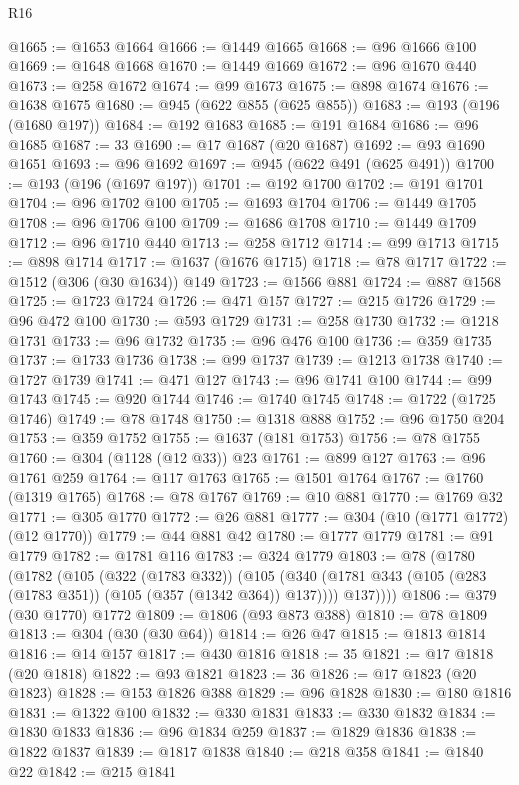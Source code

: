 \begin{lexlean}{R16}
\begin{coremodule}
@1665 := @1653 @1664
@1666 := @1449 @1665
@1668 := @96 @1666 @100
@1669 := @1648 @1668
@1670 := @1449 @1669
@1672 := @96 @1670 @440
@1673 := @258 @1672
@1674 := @99 @1673
@1675 := @898 @1674
@1676 := @1638 @1675
@1680 := @945 (@622 @855 (@625 @855))
@1683 := @193 (@196 (@1680 @197))
@1684 := @192 @1683
@1685 := @191 @1684
@1686 := @96 @1685
@1687 := 33
@1690 := @17 @1687 (@20 @1687)
@1692 := @93 @1690 @1651
@1693 := @96 @1692
@1697 := @945 (@622 @491 (@625 @491))
@1700 := @193 (@196 (@1697 @197))
@1701 := @192 @1700
@1702 := @191 @1701
@1704 := @96 @1702 @100
@1705 := @1693 @1704
@1706 := @1449 @1705
@1708 := @96 @1706 @100
@1709 := @1686 @1708
@1710 := @1449 @1709
@1712 := @96 @1710 @440
@1713 := @258 @1712
@1714 := @99 @1713
@1715 := @898 @1714
@1717 := @1637 (@1676 @1715)
@1718 := @78 @1717
@1722 := @1512 (@306 (@30 @1634)) @149
@1723 := @1566 @881
@1724 := @887 @1568
@1725 := @1723 @1724
@1726 := @471 @157
@1727 := @215 @1726
@1729 := @96 @472 @100
@1730 := @593 @1729
@1731 := @258 @1730
@1732 := @1218 @1731
@1733 := @96 @1732
@1735 := @96 @476 @100
@1736 := @359 @1735
@1737 := @1733 @1736
@1738 := @99 @1737
@1739 := @1213 @1738
@1740 := @1727 @1739
@1741 := @471 @127
@1743 := @96 @1741 @100
@1744 := @99 @1743
@1745 := @920 @1744
@1746 := @1740 @1745
@1748 := @1722 (@1725 @1746)
@1749 := @78 @1748
@1750 := @1318 @888
@1752 := @96 @1750 @204
@1753 := @359 @1752
@1755 := @1637 (@181 @1753)
@1756 := @78 @1755
@1760 := @304 (@1128 (@12 @33)) @23
@1761 := @899 @127
@1763 := @96 @1761 @259
@1764 := @117 @1763
@1765 := @1501 @1764
@1767 := @1760 (@1319 @1765)
@1768 := @78 @1767
@1769 := @10 @881
@1770 := @1769 @32
@1771 := @305 @1770
@1772 := @26 @881
@1777 := @304 (@10 (@1771 @1772) (@12 @1770))
@1779 := @44 @881 @42
@1780 := @1777 @1779
@1781 := @91 @1779
@1782 := @1781 @116
@1783 := @324 @1779
@1803 := @78
    (@1780
      (@1782
        (@105
          (@322 (@1783 @332))
          (@105
            (@340 (@1781 @343 (@105 (@283 (@1783 @351)) (@105 (@357 (@1342 @364)) @137))))
            @137))))
@1806 := @379 (@30 @1770) @1772
@1809 := @1806 (@93 @873 @388)
@1810 := @78 @1809
@1813 := @304 (@30 (@30 @64))
@1814 := @26 @47
@1815 := @1813 @1814
@1816 := @14 @157
@1817 := @430 @1816
@1818 := 35
@1821 := @17 @1818 (@20 @1818)
@1822 := @93 @1821
@1823 := 36
@1826 := @17 @1823 (@20 @1823)
@1828 := @153 @1826 @388
@1829 := @96 @1828
@1830 := @180 @1816
@1831 := @1322 @100
@1832 := @330 @1831
@1833 := @330 @1832
@1834 := @1830 @1833
@1836 := @96 @1834 @259
@1837 := @1829 @1836
@1838 := @1822 @1837
@1839 := @1817 @1838
@1840 := @218 @358
@1841 := @1840 @22
@1842 := @215 @1841

\end{coremodule}
\end{lexlean}
